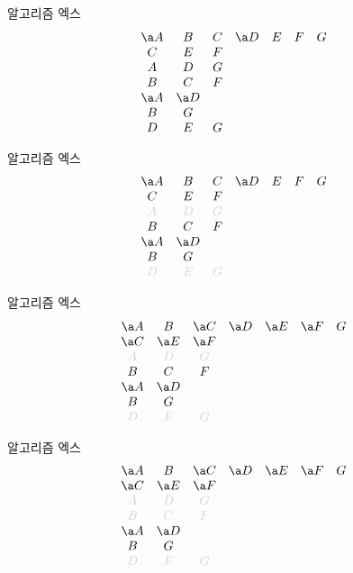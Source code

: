 \documentclass[xcolor=svgnames]{beamer}
\begin{document}
%
\begin{frame}{알고리즘 엑스}
\Large\boldmath
  $$
  \begin{array}{ccccccc}
    \a A & B & C & \a D & E & F & G\\
    C & E & F &&&&\\
    A & D & G &&&&\\
    B & C & F &&&&\\
    \a A & \a D &&&&&\\
    B & G &&&&&\\
    D & E & G &&&&
  \end{array}
  $$
\end{frame}

%
\begin{frame}{알고리즘 엑스}
\Large\boldmath
  $$
  \begin{array}{ccccccc}
    \a A & B & C & \a D & E & F & G\\
    C & E & F &&&&\\
    \g A & \g D & \g G &&&&\\
    B & C & F &&&&\\
    \a A & \a D &&&&&\\
    B & G &&&&&\\
    \g D & \g E & \g G &&&&
  \end{array}
  $$
\end{frame}

%
\begin{frame}{알고리즘 엑스}
\Large\boldmath
  $$
  \begin{array}{ccccccc}
    \a A & B & \a C & \a D & \a E & \a F & G\\
    \a C & \a E & \a F &&&&\\
    \g A & \g D & \g G &&&&\\
    B & C & F &&&&\\
    \a A & \a D &&&&&\\
    B & G &&&&&\\
    \g D & \g E & \g G &&&&
  \end{array}
  $$
\end{frame}

%
\begin{frame}{알고리즘 엑스}
\Large\boldmath
  $$
  \begin{array}{ccccccc}
    \a A & B & \a C & \a D & \a E & \a F & G\\
    \a C & \a E & \a F &&&&\\
    \g A & \g D & \g G &&&&\\
    \g B & \g C & \g F &&&&\\
    \a A & \a D &&&&&\\
    B & G &&&&&\\
    \g D & \g E & \g G &&&&
  \end{array}
  $$
\end{frame}
\end{document}
